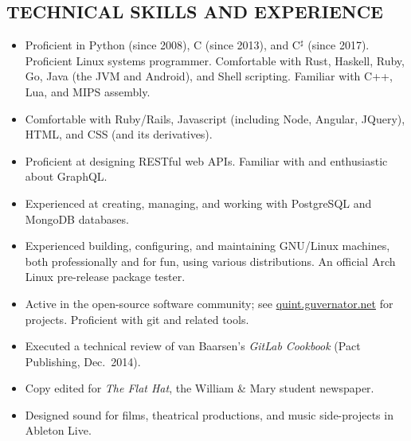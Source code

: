 \documentclass{res}     %
\begin{document}
\begin{resume}
\section{TECHNICAL SKILLS AND EXPERIENCE}
\vspace{5mm}
\begin{itemize}[leftmargin=5mm]
\item Proficient in Python (since 2008), C (since 2013), and C$^\sharp$ (since 2017). Proficient Linux systems programmer. Comfortable with Rust, Haskell, Ruby, Go, Java (the JVM and Android), and Shell scripting. Familiar with C++, Lua, and MIPS assembly.
\item Comfortable with Ruby/Rails, Javascript (including Node, Angular, JQuery), HTML, and CSS (and its derivatives).
\item Proficient at designing RESTful web APIs. Familiar with and enthusiastic about GraphQL.
\item Experienced at creating, managing, and working with PostgreSQL and MongoDB databases.
\item Experienced building, configuring, and maintaining GNU/Linux machines, both professionally and for fun, using various distributions. An official Arch Linux pre-release package tester.
\item Active in the open-source software community; see \url{quint.guvernator.net} for projects. Proficient with git and related tools.
\item Executed a technical review of van Baarsen's \emph{GitLab Cookbook} (Pact Publishing, Dec.\ 2014).
\item Copy edited for \emph{The Flat Hat}, the William \& Mary student newspaper.
\item Designed sound for films, theatrical productions, and music side-projects in Ableton Live.
\end{itemize}


\end{resume}
\end{document}
